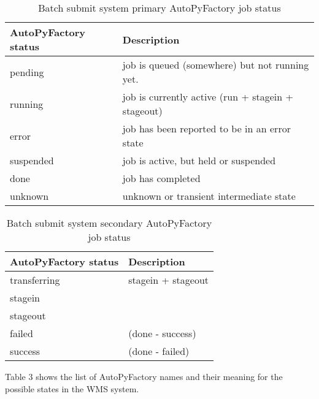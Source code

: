 \documentclass[a4paper]{jpconf}
\begin{document}
\begin{table}
   \begin{center}
      \begin{tabular}{l l}
         \hline
         \textbf{AutoPyFactory status} & \textbf{Description} \\ 
         \hline
         pending      &     job is queued (somewhere) but not running yet.      \\  
         running      &     job is currently active (run + stagein + stageout)  \\ 
         error        &     job has been reported to be in an error state       \\ 
         suspended    &     job is active, but held or suspended                \\ 
         done         &     job has completed                                   \\ 
         unknown      &     unknown or transient intermediate state             \\ 
         \hline
      \end{tabular}
   \end{center}
   \caption{Batch submit system primary AutoPyFactory job status}
   \label{job secondary status}
\end{table}

\begin{table}
   \begin{center}
      \begin{tabular}{l l}
         \hline
         \textbf{AutoPyFactory status} & \textbf{Description}  \\ 
         \hline
         transferring  &     stagein + stageout  \\ 
         stagein       &                         \\ 
         stageout      &                         \\ 
         failed        &     (done - success)    \\ 
         success       &     (done - failed)     \\ 
         \hline
      \end{tabular}
   \end{center}
   \caption{Batch submit system secondary AutoPyFactory job status} 
   \label{job secondary status}
\end{table}

Table 3 shows the list of AutoPyFactory names and their meaning 
for the possible states in the WMS system.
\end{document}
